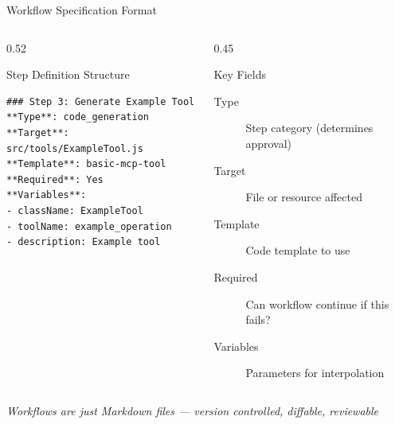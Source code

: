 \documentclass[aspectratio=169]{beamer}
\begin{document}
\begin{frame}[fragile]{Workflow Specification Format}
\begin{columns}[T]
\begin{column}{0.52\textwidth}
\begin{block}{Step Definition Structure}
\begin{lstlisting}
### Step 3: Generate Example Tool
**Type**: code_generation
**Target**: src/tools/ExampleTool.js
**Template**: basic-mcp-tool
**Required**: Yes
**Variables**:
- className: ExampleTool
- toolName: example_operation
- description: Example tool
\end{lstlisting}
\end{block}
\end{column}

\begin{column}{0.45\textwidth}
\begin{block}{Key Fields}
\begin{description}
    \item[Type] Step category (determines approval)
    \item[Target] File or resource affected
    \item[Template] Code template to use
    \item[Required] Can workflow continue if this fails?
    \item[Variables] Parameters for interpolation
\end{description}
\end{block}
\end{column}
\end{columns}

\vspace{0.3em}
\begin{center}
\footnotesize\textit{Workflows are just Markdown files — version controlled, diffable, reviewable}
\end{center}
\end{frame}
\end{document}

